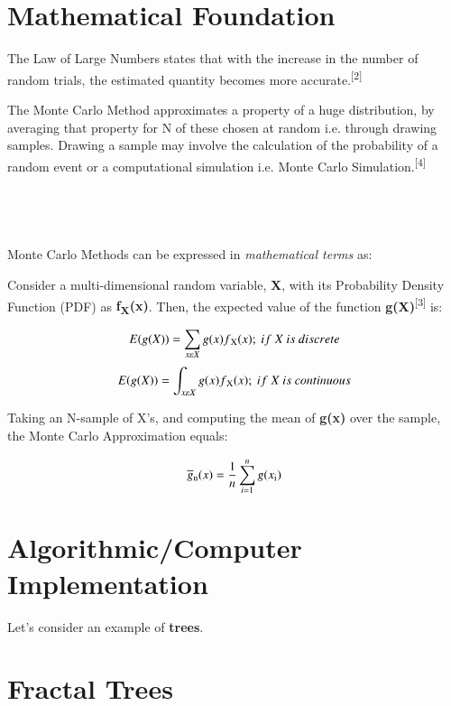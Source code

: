 \documentclass{resonance}
\begin{document}
\section*{Mathematical Foundation}
The Law of Large Numbers states that with the increase in the number of random trials, the estimated quantity becomes more accurate.\textsuperscript{[2]}

The Monte Carlo Method approximates a property of a huge distribution, by averaging that property for N of these chosen at random i.e. through drawing samples. Drawing a sample may involve the calculation of the probability of a random event or a computational simulation i.e. Monte Carlo Simulation.\textsuperscript{[4]}\\\\\\\\\\

\pagebreak
\setlength{\leftskip}{-4cm}
Monte Carlo Methods can be expressed in \textit{mathematical terms} as:

Consider a multi-dimensional random variable, \textbf{X}, with its Probability Density Function (PDF) as \textbf{f\textsubscript{X}(x)}. Then, the expected value of the function \textbf{g(X)}\textsuperscript{[3]} is:

$$E(g(X)) = \sum_{x\varepsilon X} g(x)f\textsubscript{X}(x);\ if\ X\ is\ discrete$$
$$E(g(X)) = \int_{x\varepsilon X} g(x)f\textsubscript{X}(x);\ if\ X\ is\ continuous$$

Taking an N-sample of X’s, and computing the mean of \textbf{g(x)} over the sample, the Monte Carlo Approximation equals:

$$ \overline{g}\textsubscript{n}(x) = \frac{1}{n} \sum_{i=1}^{n}g(x\textsubscript{i}) $$

\section*{Algorithmic/Computer Implementation}
Let's consider an example of \textbf{trees}.


\setlength{\leftskip}{0cm}
\section{Fractal Trees}

\end{document}

